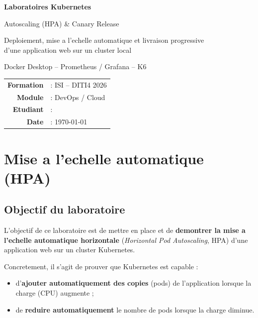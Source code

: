 \documentclass[11pt,a4paper]{report}
\begin{document}
\begin{titlepage}
  \centering
  \vspace*{2cm}
  {\Huge\bfseries\color{k8sblue} Laboratoires Kubernetes\par}
  \vspace{0.6cm}
  {\Large Autoscaling (HPA) \& Canary Release\par}
  \vspace{1cm}
  {\large Deploiement, mise a l'echelle automatique et livraison progressive\\[4pt]
   d'une application web sur un cluster local\par}
  \vspace{0.4cm}
  {\large Docker Desktop -- Prometheus / Grafana -- K6\par}
  \vfill
  \begin{tabular}{rl}
    \textbf{Formation} & : ISI -- DITI4 2026 \\
    \textbf{Module}    & : DevOps / Cloud \\
    \textbf{Etudiant}  & : \underline{\hspace{5cm}} \\
    \textbf{Date}      & : \today \\
  \end{tabular}
  \vfill
\end{titlepage}

\tableofcontents
\newpage

\chapter{Mise a l'echelle automatique (HPA)}

\section{Objectif du laboratoire}

L'objectif de ce laboratoire est de mettre en place et de \textbf{demontrer la mise a
l'echelle automatique horizontale} (\emph{Horizontal Pod Autoscaling}, HPA) d'une
application web sur un cluster Kubernetes.

\medskip
Concretement, il s'agit de prouver que Kubernetes est capable :
\begin{itemize}[nosep]
  \item d'\textbf{ajouter automatiquement des copies} (pods) de l'application lorsque la
        charge (CPU) augmente ;
  \item de \textbf{reduire automatiquement} le nombre de pods lorsque la charge diminue.
\end{itemize}
\end{document}

